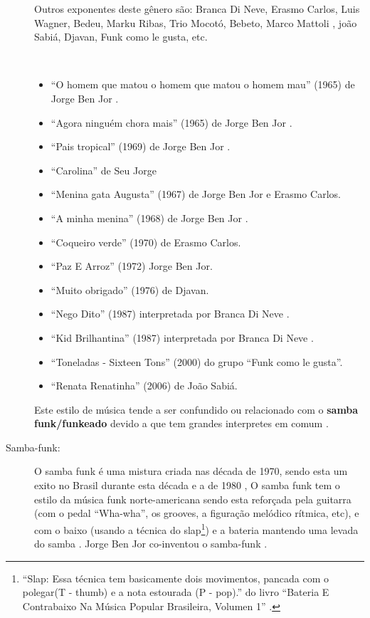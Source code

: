 \begin{description}
Outros exponentes deste gênero são: 
Branca Di Neve,
Erasmo Carlos,
Luis Wagner,
Bedeu,
Marku Ribas,
Trio Mocotó,
Bebeto,
Marco Mattoli \cite[pp. 301]{de2003tem},
joão Sabiá,
Djavan,
Funk como le gusta,
 etc.
\begin{example} ~

\begin{itemize}
\item ``O homem que matou o homem que matou o homem mau'' (1965) de Jorge Ben Jor \cite[pp. 301]{de2003tem}.
\item ``Agora ninguém chora mais'' (1965) de Jorge Ben Jor \cite[pp. 301]{de2003tem}.
\item ``Pais tropical'' (1969) de Jorge Ben Jor \cite[pp. 188]{moehn2012contemporary}.
\item ``Carolina'' de Seu Jorge \cite[pp. 258]{2001raca}
\item ``Menina gata Augusta'' (1967) de Jorge Ben Jor e Erasmo Carlos.
\item ``A minha menina'' (1968) de Jorge Ben Jor \cite[pp. 232]{diniz2006almanaque}.
\item ``Coqueiro verde'' (1970) de Erasmo Carlos.
\item ``Paz E Arroz'' (1972) Jorge Ben Jor.
\item ``Muito obrigado'' (1976) de Djavan.
\item ``Nego Dito'' (1987) interpretada por Branca Di Neve \cite{BrancaDiNeve1987}.
\item ``Kid Brilhantina'' (1987)  interpretada por Branca Di Neve \cite{BrancaDiNeve1987}.

\item ``Toneladas - Sixteen Tons'' (2000) do grupo ``Funk como le gusta''.
\item ``Renata Renatinha'' (2006) de João Sabiá.
\end{itemize}
\end{example}

Este estilo de música tende a ser confundido ou relacionado com o \textbf{samba funk/funkeado} 
devido a que tem grandes interpretes em comum \cite[pp. 36]{montanhaurbateria} \cite[pp. 131]{perna2002samba}.

\item[Samba-funk:]
O samba funk é uma mistura criada nas década de 1970, 
sendo esta um exito no Brasil durante esta década e a de 1980
\cite[pp. 36]{montanhaurbateria} \cite[pp. 11]{medeiros2012brazilian}, 
O samba funk tem o estilo da música funk norte-americana 
sendo esta  reforçada pela guitarra 
(com o pedal ``Wha-wha'', os grooves, a figuração melódico rítmica, etc), e com
o baixo (usando a técnica do slap\footnote{``Slap: Essa técnica tem basicamente dois movimentos, 
pancada com o polegar(T - thumb) e a nota estourada (P - pop).'' do livro 
``Bateria E Contrabaixo Na Música Popular Brasileira, Volumen 1'' \cite[pp. 36]{montanhaurbateria}.}) 
e a bateria mantendo uma levada do samba \cite[pp. 11]{medeiros2012brazilian}.
Jorge Ben Jor co-inventou o samba-funk \cite[pp. 166]{sanches2000tropicalismo}.



\end{description}
